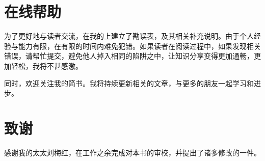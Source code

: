 \section*{在线帮助}

\begin{content}

为了更好地与读者交流，在我的上建立了勘误表，及其相关补充说明。由于个人经验与能力有限，在有限的时间内难免犯错。如果读者在阅读过程中，如果发现相关错误，请帮忙提交，避免他人掉入相同的陷阱之中，让知识分享变得更加通畅，更加轻松，我将不甚感激。

同时，欢迎关注我的简书。我将持续更新相关的文章，与更多的朋友一起学习和进步。

\begin{enum}
\end{enum}

\end{content}

\section*{致谢}

\begin{content}

感谢我的太太刘梅红，在工作之余完成对本书的审校，并提出了诸多修改的一件。

\end{content}
